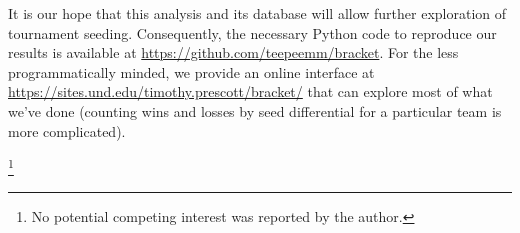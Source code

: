 \documentclass{article}
\begin{document}
It is our hope that this analysis and its database will allow further exploration of tournament seeding.  Consequently, the necessary Python code to reproduce our results is available at \url{https://github.com/teepeemm/bracket}.  For the less programmatically minded, we provide an online interface at \url{https://sites.und.edu/timothy.prescott/bracket/} that can explore most of what we've done (counting wins and losses by seed differential for a particular team is more complicated).

\printbibliography
\thanks{No potential competing interest was reported by the author.}
\end{document}
